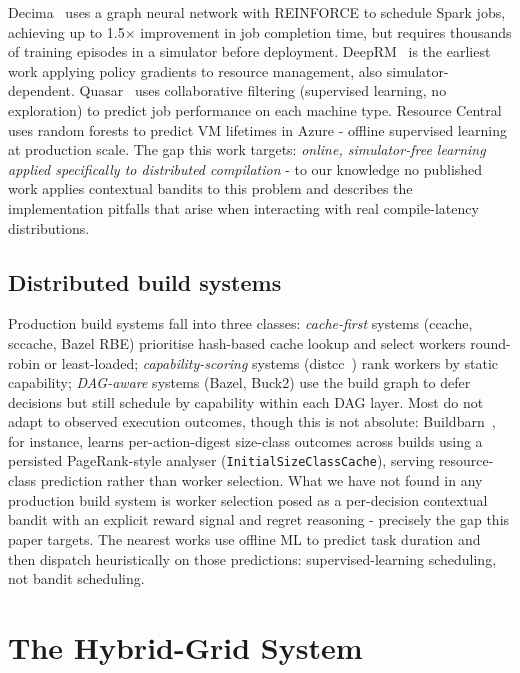 \documentclass[final,5p,times,twocolumn]{elsarticle}
\begin{document}
Decima~\cite{decima} uses a graph neural network with REINFORCE to schedule Spark jobs, achieving up to 1.5$\times$ improvement in job completion time, but requires thousands of training episodes in a simulator before deployment. DeepRM~\cite{deeprm} is the earliest work applying policy gradients to resource management, also simulator-dependent. Quasar~\cite{quasar} uses collaborative filtering (supervised learning, no exploration) to predict job performance on each machine type. Resource Central~\cite{resourcecentral} uses random forests to predict VM lifetimes in Azure - offline supervised learning at production scale. The gap this work targets: \emph{online, simulator-free learning applied specifically to distributed compilation} - to our knowledge no published work applies contextual bandits to this problem and describes the implementation pitfalls that arise when interacting with real compile-latency distributions.

\subsection{Distributed build systems}

Production build systems fall into three classes: \emph{cache-first} systems (ccache, sccache, Bazel RBE) prioritise hash-based cache lookup and select workers round-robin or least-loaded; \emph{capability-scoring} systems (distcc~\cite{distcc}) rank workers by static capability; \emph{DAG-aware} systems (Bazel, Buck2) use the build graph to defer decisions but still schedule by capability within each DAG layer. Most do not adapt to observed execution outcomes, though this is not absolute: Buildbarn~\cite{buildbarn}, for instance, learns per-action-digest size-class outcomes across builds using a persisted PageRank-style analyser (\texttt{InitialSizeClassCache}), serving resource-class prediction rather than worker selection. What we have not found in any production build system is worker selection posed as a per-decision contextual bandit with an explicit reward signal and regret reasoning - precisely the gap this paper targets. The nearest works use offline ML to predict task duration and then dispatch heuristically on those predictions: supervised-learning scheduling, not bandit scheduling.

\section{The Hybrid-Grid System}
\label{sec:system}
\end{document}
